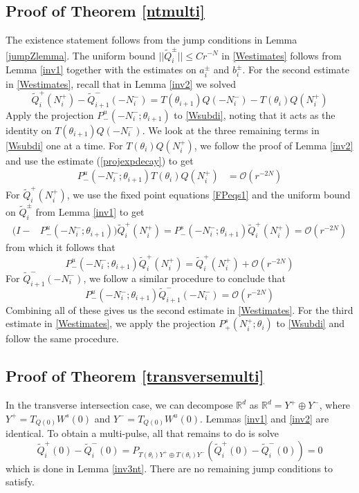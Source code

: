 \documentclass[12pt]{article}
\def\R{{\mathbb R}}
\begin{document}
\subsection{Proof of Theorem \ref{ntmulti}}

The existence statement follows from the jump conditions in Lemma \ref{jumpZlemma}. The uniform bound $||\tilde{Q}_i^\pm|| \leq C r^{-N}$ in \eqref{Westimates} follows from Lemma \ref{inv1} together with the estimates on $a_i^\pm$ and $b_i^\pm$. For the second estimate in \eqref{Westimates}, recall that in Lemma \ref{inv2} we solved
\begin{equation}\label{Wsubdi}
\tilde{Q}_i^+(N_i^+) - \tilde{Q}_{i+1}^-(-N_i^-) = T(\theta_{i+1}) Q(-N_i^-) - T(\theta_i) Q(N_i^+)
\end{equation}
Apply the projection $P^u_-(-N_i^-; \theta_{i+1})$ to \eqref{Wsubdi}, noting that it acts as the identity on $T(\theta_{i+1}) Q(-N_i^-)$. We look at the three remaining terms in \eqref{Wsubdi} one at a time. For $T(\theta_i) Q(N_i^+)$, we follow the proof of Lemma \ref{inv2} and use the estimate (\ref{projexpdecay}) to get
\begin{align*}
P^u_-(-N_i^-; \theta_{i+1})T(\theta_i) Q(N_i^+)
&= \mathcal{O}(r^{-2N})
\end{align*}
For $\tilde{Q}_i^+(N_i^+)$, we use the fixed point equations \eqref{FPeqs1} and the uniform bound on $\tilde{Q}_i^\pm$ from Lemma \ref{inv1} to get
\begin{align*}
(I - &P^u_-(-N_i^-; \theta_{i+1})) \tilde{Q}_i^+(N_i^+) = P^s_-(-N_i^-; \theta_{i+1}) \tilde{Q}_i^+(N_i^+) = \mathcal{O}(r^{-2N})
\end{align*}
from which it follows that
\[
P^u_-(-N_i^-; \theta_{i+1}) \tilde{Q}_i^+(N_i^+) = \tilde{Q}_i^+(N_i^+) + \mathcal{O}(r^{-2N})
\]
For $\tilde{Q}_{i+1}^-(-N_i^-)$, we follow a similar procedure to conclude that
\[
P^u_-(-N_i^-; \theta_{i+1}) \tilde{Q}_{i+1}^-(-N_i^-) = \mathcal{O}(r^{-2N})
\]
Combining all of these gives us the second estimate in \eqref{Westimates}. For the third estimate in \eqref{Westimates}, we apply the projection $P^s_+(N_i^+; \theta_i)$ to \eqref{Wsubdi} and follow the same procedure.

\subsection{Proof of Theorem \ref{transversemulti}}

In the transverse intersection case, we can decompose $\R^d$ as $\R^d = Y^+ \oplus Y^-$, where $Y^+ = T_{Q(0)} W^s(0)$ and $Y^- = T_{Q(0)} W^u(0)$. Lemmas \ref{inv1} and \ref{inv2} are identical. To obtain a multi-pulse, all that remains to do is solve 
\[
\tilde{Q}_i^+(0) - \tilde{Q}_i^-(0) = P_{T(\theta_i)Y^+ \oplus T(\theta_i)Y^-}( \tilde{Q}_i^+(0) - \tilde{Q}_i^-(0) ) = 0
\]
which is done in Lemma \ref{inv3nt}. There are no remaining jump conditions to satisfy.
\end{document}
